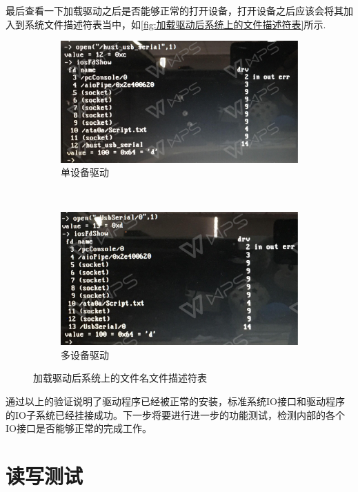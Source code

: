 \noindent 最后查看一下加载驱动之后是否能够正常的打开设备，打开设备之后应该会将其加入到系统文件描述符表当中，如\autoref{fig:加载驱动后系统上的文件描述符表}所示.
\begin{figure}[h]
\centering
  \begin{subfigure}[b]{0.4\textwidth}
  \includegraphics[width=\textwidth]{./graphics/iosFdShowS.pdf}
  \caption{单设备驱动}
  \end{subfigure}
  ~
  \begin{subfigure}[b]{0.4\textwidth}
  \includegraphics[width=\textwidth]{./graphics/iosFdShowM.pdf}
  \caption{多设备驱动}
  \end{subfigure}
\caption{加载驱动后系统上的文件名文件描述符表}\label{fig:加载驱动后系统上的文件描述符表}
\end{figure}

通过以上的验证说明了驱动程序已经被正常的安装，标准系统IO接口和驱动程序的IO子系统已经挂接成功。下一步将要进行进一步的功能测试，检测内部的各个IO接口是否能够正常的完成工作。
	
\section{读写测试}

